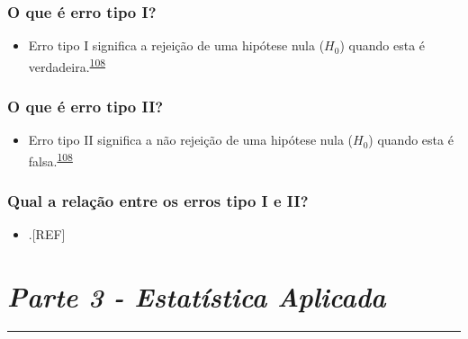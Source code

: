 \documentclass[
  a4paper,
]{book}
\providecommand{\tightlist}{%
  \setlength{\itemsep}{0pt}\setlength{\parskip}{0pt}}
\begin{document}
\hypertarget{o-que-uxe9-erro-tipo-i}{%
\subsection{O que é erro tipo I?}\label{o-que-uxe9-erro-tipo-i}}

\begin{itemize}
\tightlist
\item
  Erro tipo I significa a rejeição de uma hipótese nula (\(H_{0}\)) quando esta é verdadeira.\textsuperscript{\protect\hyperlink{ref-Curran-Everett2009}{108}}
\end{itemize}

\hypertarget{o-que-uxe9-erro-tipo-ii}{%
\subsection{O que é erro tipo II?}\label{o-que-uxe9-erro-tipo-ii}}

\begin{itemize}
\tightlist
\item
  Erro tipo II significa a não rejeição de uma hipótese nula (\(H_{0}\)) quando esta é falsa.\textsuperscript{\protect\hyperlink{ref-Curran-Everett2009}{108}}
\end{itemize}

\hypertarget{qual-a-relauxe7uxe3o-entre-os-erros-tipo-i-e-ii}{%
\subsection{Qual a relação entre os erros tipo I e II?}\label{qual-a-relauxe7uxe3o-entre-os-erros-tipo-i-e-ii}}

\begin{itemize}
\tightlist
\item
  .{[}REF{]}
\end{itemize}


\hypertarget{parte-3---estatuxedstica-aplicada}{%
\chapter*{\texorpdfstring{\emph{Parte 3 - Estatística Aplicada}}{Parte 3 - Estatística Aplicada}}\label{parte-3---estatuxedstica-aplicada}}

\markboth{}{}
\par\noindent\rule{\textwidth}{0.05in}
\end{document}
